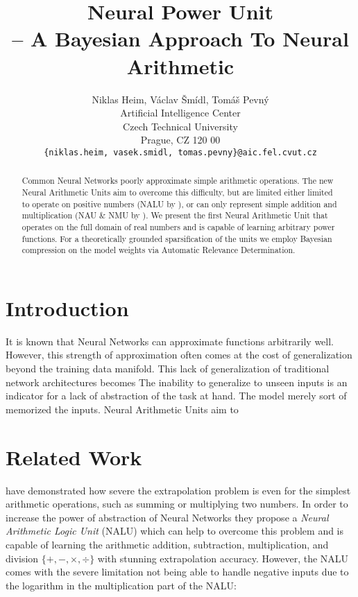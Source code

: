 \documentclass[9pt]{article}
\title{Neural Power Unit \\-- A Bayesian Approach To Neural Arithmetic}
\author{
  Niklas Heim,
  V\'aclav \v Sm\'idl,
  Tom\'a\v s Pevn\'y \\
  Artificial Intelligence Center\\
  Czech Technical University\\
  Prague, CZ 120 00\\
  \texttt{\{niklas.heim, vasek.smidl, tomas.pevny\}@aic.fel.cvut.cz}\\
}
\begin{document}
\maketitle

\begin{abstract}
  Common Neural Networks poorly approximate simple arithmetic operations.  The
  new Neural Arithmetic Units aim to overcome this difficulty, but are limited
  either limited to operate on positive numbers (NALU by
  \citet{trask_neural_2018}), or can only represent simple addition and
  multiplication (NAU \& NMU by \citet{madsen_neural_2020}).
  We present the first Neural Arithmetic Unit that operates on the full domain
  of real numbers and is capable of learning arbitrary power functions.
  For a theoretically grounded sparsification of the units we employ Bayesian
  compression on the model weights via Automatic Relevance Determination.
\end{abstract}


\section{Introduction}%
\label{sec:introduction}


It is known that Neural Networks can approximate functions arbitrarily
well.  However, this strength of approximation
often comes at the cost of generalization beyond the training data manifold.
This lack of generalization of traditional network architectures becomes 
The inability to generalize to unseen inputs is an indicator for a lack of
abstraction of the task at hand. The model merely sort of memorized the inputs.
Neural Arithmetic Units aim to 


\section{Related Work}%
\label{sec:related_work}

\citet{trask_neural_2018} have demonstrated how severe the extrapolation problem is even for
the simplest arithmetic operations, such as summing or multiplying two numbers.
In order to increase the power of abstraction of Neural Networks they propose a
\emph{Neural Arithmetic Logic Unit} (NALU) which can help to overcome this
problem \cite{trask_neural_2018} and is capable of learning the arithmetic
addition, subtraction, multiplication, and division
$\{+,-,\times,\div\}$ with stunning extrapolation accuracy.  However,
the NALU comes with the severe limitation not being able to handle negative
inputs due to the logarithm in the multiplication part of the NALU:
\end{document}
